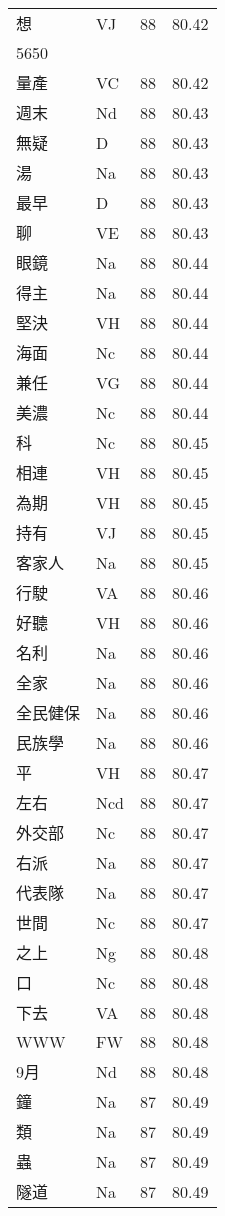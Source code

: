 \documentclass[twocolumn]{book}
\begin{document}
\begin{supertabular}{llrr}
想 & VJ & 88 &  80.42\\
5650\\
量產 & VC & 88 &  80.42\\
週末 & Nd & 88 &  80.43\\
無疑 & D & 88 &  80.43\\
湯 & Na & 88 &  80.43\\
最早 & D & 88 &  80.43\\
聊 & VE & 88 &  80.43\\
眼鏡 & Na & 88 &  80.44\\
得主 & Na & 88 &  80.44\\
堅決 & VH & 88 &  80.44\\
海面 & Nc & 88 &  80.44\\
兼任 & VG & 88 &  80.44\\
美濃 & Nc & 88 &  80.44\\
科 & Nc & 88 &  80.45\\
相連 & VH & 88 &  80.45\\
為期 & VH & 88 &  80.45\\
持有 & VJ & 88 &  80.45\\
客家人 & Na & 88 &  80.45\\
行駛 & VA & 88 &  80.46\\
好聽 & VH & 88 &  80.46\\
名利 & Na & 88 &  80.46\\
全家 & Na & 88 &  80.46\\
全民健保 & Na & 88 &  80.46\\
民族學 & Na & 88 &  80.46\\
平 & VH & 88 &  80.47\\
左右 & Ncd & 88 &  80.47\\
外交部 & Nc & 88 &  80.47\\
右派 & Na & 88 &  80.47\\
代表隊 & Na & 88 &  80.47\\
世間 & Nc & 88 &  80.47\\
之上 & Ng & 88 &  80.48\\
口 & Nc & 88 &  80.48\\
下去 & VA & 88 &  80.48\\
WWW & FW & 88 &  80.48\\
9月 & Nd & 88 &  80.48\\
鐘 & Na & 87 &  80.49\\
類 & Na & 87 &  80.49\\
蟲 & Na & 87 &  80.49\\
隧道 & Na & 87 &  80.49\\

\end{supertabular}
\end{document}
